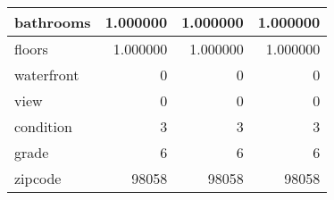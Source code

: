 \begin{table}[H]
\begin{tabular}{|l|r|r|r|}
\hline bathrooms & \cellcolor[rgb]{0.9, 0.54, 0.52} 1.000000 & \cellcolor[rgb]{0.9, 0.54, 0.52} 1.000000 & \cellcolor[rgb]{0.9, 0.54, 0.52} 1.000000 \\
\hline floors & \cellcolor[rgb]{0.9, 0.54, 0.52} 1.000000 & \cellcolor[rgb]{0.9, 0.54, 0.52} 1.000000 & \cellcolor[rgb]{0.9, 0.54, 0.52} 1.000000 \\
\hline waterfront & \cellcolor[rgb]{0.9, 0.54, 0.52} 0 & \cellcolor[rgb]{0.9, 0.54, 0.52} 0 & \cellcolor[rgb]{0.9, 0.54, 0.52} 0 \\
\hline view & \cellcolor[rgb]{0.9, 0.54, 0.52} 0 & \cellcolor[rgb]{0.9, 0.54, 0.52} 0 & \cellcolor[rgb]{0.9, 0.54, 0.52} 0 \\
\hline condition & \cellcolor[rgb]{0.9, 0.54, 0.52} 3 & \cellcolor[rgb]{0.9, 0.54, 0.52} 3 & \cellcolor[rgb]{0.9, 0.54, 0.52} 3 \\
\hline grade & \cellcolor[rgb]{0.9, 0.54, 0.52} 6 & \cellcolor[rgb]{0.9, 0.54, 0.52} 6 & \cellcolor[rgb]{0.9, 0.54, 0.52} 6 \\
\hline zipcode & \cellcolor[rgb]{0.9, 0.54, 0.52} 98058 & \cellcolor[rgb]{0.9, 0.54, 0.52} 98058 & \cellcolor[rgb]{0.9, 0.54, 0.52} 98058 \\
\hline
\end{tabular}
\end{table}
